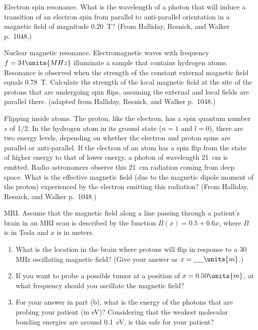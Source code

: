 \begin{aproblem}{Electron spin resonance.}  
  What is the wavelength of a photon that will induce a transition of
  an electron spin from parallel to anti-parallel orientation in a
  magnetic field of magnitude 0.20\, T?  (From Halliday, Resnick, and
  Walker p.~1048.)
  \label{prob:spinflip}
\end{aproblem}

\newpage

\begin{aproblem}{Nuclear magnetic resonance.}
  Electromagnetic waves with frequency $f = 34\units{MHz}$ illuminate
  a sample that contains hydrogen atoms.  Resonance is observed when
  the strength of the constant external magnetic field equals 0.78\,
  T.  Calculate the strength of the local magnetic field at the site
  of the protons that are undergoing spin flips, assuming the external
  and local fields are parallel there.  (adapted from Halliday,
  Resnick, and Walker p.~1048.)
  \label{prob:nmr}
\end{aproblem}


\begin{aproblem}{Flipping inside atoms.}  
  The proton, like the electron, has a spin quantum number $s$ of 1/2.
  In the hydrogen atom in its ground state ($n = 1$ and $l = 0$),
  there are two energy levels, depending on whether the electron and
  proton spins are parallel or anti-parallel.  If the electron of an
  atom has a spin flip from the state of higher energy to that of
  lower energy, a photon of wavelength 21\, cm is emitted.  Radio
  astronomers observe this 21\, cm radiation coming from deep
  space. What is the effective magnetic field (due to the magnetic
  dipole moment of the proton) experienced by the electron emitting
  this radiation?  (From Halliday, Resnick, and Walker p.~1048.)
\end{aproblem}


\begin{aproblem}{MRI.} 
  Assume that the magnetic field along a line passing through a
  patient's brain in an MRI scan is described by the function $B(x) =
  0.5 + 0.6x$, where $B$ is in Tesla and $x$ is in meters.

  \begin{enumerate}
  \item What is the location in the brain where protons will flip in
    response to a 30\, MHz oscillating magnetic field?  (Give your
    answer as $x = \mbox{\underline{\hspace{0.2in}}}\units{m}$.)
  \item If you want to probe a possible tumor at a position of $x =
    0.50\units{m}$, at what frequency should you oscillate the
    magnetic field?
  \item For your answer in part (b), what is the energy of the photons
    that are probing your patient (in eV)?  Considering that the
    weakest molecular bonding energies are around 0.1\, eV, is this
    safe for your patient?
  \end{enumerate}
\end{aproblem}


